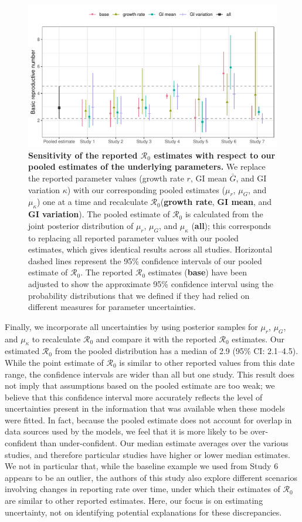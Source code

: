 \documentclass[12pt]{article}
\newcommand{\Ro}{\ensuremath{{\mathcal R}_{0}}\xspace}
\begin{document}
\begin{figure}[!th]
\includegraphics[width=\textwidth]{compare_R0.pdf}
\caption{
\textbf{Sensitivity of the reported \Ro estimates with respect to our pooled estimates of the underlying parameters.}
We replace the reported parameter values (growth rate $r$, GI mean $\bar G$, and GI variation $\kappa$) with our corresponding pooled estimates ($\mu_r$, $\mu_G$, and $\mu_\kappa$) one at a time and recalculate \Ro (\textbf{growth rate}, \textbf{GI mean}, and \textbf{GI variation}).
The pooled estimate of \Ro is calculated from the joint posterior distribution of $\mu_r$, $\mu_G$, and $\mu_\kappa$ (\textbf{all});
this corresponds to replacing all reported parameter values with our pooled estimates, which gives identical results across all studies.
Horizontal dashed lines represent the 95\% confidence intervals of our pooled estimate of \Ro.
The reported \Ro estimates (\textbf{base}) have been adjusted to show the approximate 95\% confidence interval using the probability distributions that we defined if they had relied on different measures for parameter uncertainties.
}
\label{fig:R0}
\end{figure}

Finally, we incorporate all uncertainties by using posterior samples for $\mu_r$, $\mu_G$, and $\mu_\kappa$ to recalculate \Ro and compare it with the reported \Ro estimates.
Our estimated \Ro from the pooled distribution has a median of 2.9 (95\% CI: 2.1--4.5).
While the point estimate of \Ro is similar to other reported values from this date range, the confidence intervals are wider than all but one study.
This result does not imply that assumptions based on the pooled estimate are too weak;
we believe that this confidence interval more accurately reflects the level of uncertainties present in the information that was available when these models were fitted.
In fact, because the pooled estimate does not account for overlap in data sources used by the models, we feel that it is more likely to be over-confident than under-confident.
Our median estimate averages over the various studies, and therefore particular studies have higher or lower median estimates.
We not in particular that, while the baseline example we used from Study 6 appears to be an outlier, the authors of this study also explore different scenarios involving changes in reporting rate over time, under which their estimates of \Ro are similar to other reported estimates.
Here, our focus is on estimating uncertainty, not on identifying potential explanations for these discrepancies.
\end{document}
